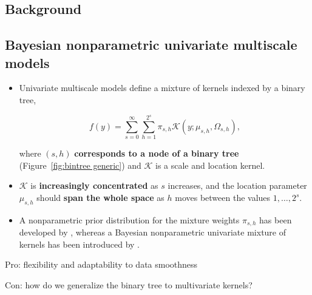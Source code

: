 \documentclass[a0,portrait]{a0poster}
\begin{document}
\begin{multicols}{2}
\color{DarkRed}
\section*{Background}
\color{Black}

\subsection*{Bayesian nonparametric univariate multiscale models}
\color{Black}

\begin{itemize}
    \item[] Univariate multiscale models define a mixture of kernels indexed by a binary tree,

        \[
            f(y) = \sum_{s=0}^{\infty }\sum_{h=1}^{2^{s}} \pi_{s,h} \mathcal{K}(y; \mu_{s,h}, \Omega_{s,h}),
        \]

        where $(s,h)$ \textbf{corresponds to a node of a binary tree} (Figure~\ref{fig:bintree generic}) and $ \mathcal{K}$ is a scale and location kernel.
        
    \item[] $ \mathcal{K}$ is \textbf{increasingly concentrated} as $ s$ increases, and the location parameter $ \mu_{s,h}$ should \textbf{span the whole space} as $ h$ moves between the values $ 1, \ldots, 2^{s}$.

    \item[] A nonparametric prior distribution for the mixture weights $ \pi_{s,h}$ has been developed by \citet{canale2016b}, whereas a Bayesian nonparametric univariate mixture of kernels has been introduced by \citet{stefanucci2021}.
        
\end{itemize}


\color{Black}
\begin{center}\vspace{1cm}
  
\end{center}\vspace{1cm}

\begin{flushright}
    \color{ForestGreen}
    \smiley{} Pro: flexibility and adaptability to data smoothness

\noindent
\color{red}
\frownie{} Con: how do we generalize the binary tree to multivariate kernels?
\end{flushright}


\end{multicols}
\end{document}
